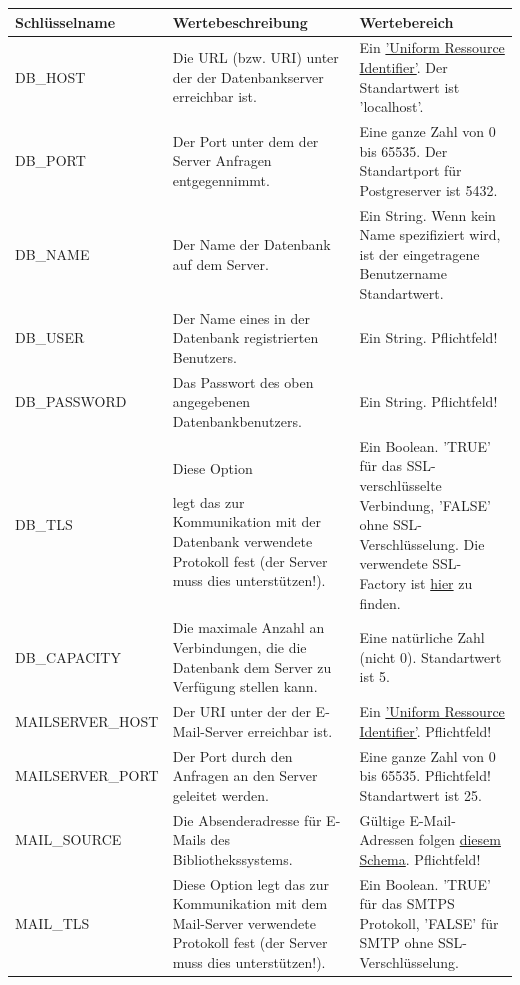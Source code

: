 \documentclass{article}
\begin{document}
\begin{center}
\begin{table}[H]
\hypertarget{tabelle}{}
\begin{tabular} {| m{4cm} | m{6cm} | m{5cm} |}
\hline
Schlüsselname & Wertebeschreibung & Wertebereich \\
\hline
DB\_HOST & Die URL (bzw. URI) unter der der Datenbankserver erreichbar ist.& Ein \hyperlink{https://datatracker.ietf.org/doc/html/rfc3986}{'Uniform Ressource Identifier'}. Der Standartwert ist 'localhost'.\\
\hline
DB\_PORT & Der Port unter dem der Server Anfragen entgegennimmt. & Eine ganze Zahl von 0 bis 65535. Der Standartport für Postgreserver ist 5432.\\
\hline
DB\_NAME & Der Name der Datenbank auf dem Server. & Ein String. Wenn kein Name spezifiziert wird, ist der eingetragene Benutzername Standartwert.\\
\hline
DB\_USER & Der Name eines in der Datenbank registrierten Benutzers. & Ein String. Pflichtfeld!\\
\hline
DB\_PASSWORD & Das Passwort des oben angegebenen Datenbankbenutzers. & Ein String. Pflichtfeld!\\
\hline
DB\_TLS &  \hypertarget{DBSSL}{Diese Option} legt das zur Kommunikation mit der Datenbank verwendete Protokoll fest (der Server muss dies unterstützen!). & Ein Boolean. 'TRUE' für das SSL-verschlüsselte Verbindung, 'FALSE' ohne SSL-Verschlüsselung. Die verwendete SSL-Factory ist \hyperlink{https://jdbc.postgresql.org/documentation/publicapi/org/postgresql/ssl/DefaultJavaSSLFactory.html}{hier} zu finden.\\ 
\hline
DB\_CAPACITY & Die maximale Anzahl an Verbindungen, die die Datenbank dem Server zu Verfügung stellen kann. & Eine natürliche Zahl (nicht 0). Standartwert ist 5.\\
\hline
MAILSERVER\_HOST & Der URI unter der der E-Mail-Server erreichbar ist. &  Ein \hyperlink{https://datatracker.ietf.org/doc/html/rfc3986}{'Uniform Ressource Identifier'}. Pflichtfeld! \\
\hline
MAILSERVER\_PORT & Der Port durch den Anfragen an den Server geleitet werden. & Eine ganze Zahl von 0 bis 65535. Pflichtfeld! Standartwert ist 25. \\
\hline
MAIL\_SOURCE & Die Absenderadresse für E-Mails des Bibliothekssystems. & Gültige E-Mail-Adressen folgen \hyperlink{https://datatracker.ietf.org/doc/html/rfc5322}{diesem Schema}. Pflichtfeld!\\
\hline
MAIL\_TLS & Diese Option legt das zur Kommunikation mit dem Mail-Server verwendete Protokoll fest (der Server muss dies unterstützen!). & Ein Boolean. 'TRUE' für das SMTPS Protokoll, 'FALSE' für SMTP ohne SSL-Verschlüsselung.\\ 

\end{tabular}
\end{table}
\end{center}
\end{document}
